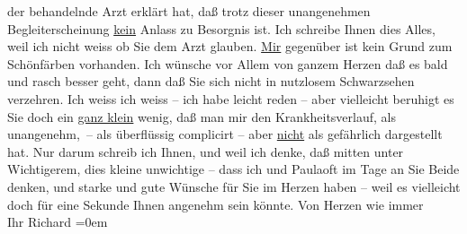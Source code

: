 \begin{ledgroupsized}[t]{13cm}
               der behandelnde Arzt erklärt
               hat, daß trotz dieser unangenehmen Begleiterscheinung \uline{kein} Anlass zu Besorgnis ist. Ich schreibe Ihnen dies Alles, weil ich {\pb}nicht weiss ob Sie dem Arzt glauben. \uline{Mir} gegenüber ist kein Grund zum Schönfärben
               vorhanden. Ich wünsche vor Allem von ganzem Herzen daß es bald und rasch {\pb}besser geht, dann daß Sie sich
               nicht in nutzlosem Schwarzsehen  verzehren. Ich
               weiss ich weiss – ich habe leicht reden – aber vielleicht beruhigt es Sie doch ein
                  \uline{ganz klein} wenig, daß man mir den
               Krankheitsverlauf, als unangenehm, – als überflüssig complicirt – aber \uline{nicht} als gefährlich dargestellt hat.\pend
           \pstart
           {\pb}Nur darum schreib ich Ihnen, und
               weil ich denke, daß mitten unter Wichtigerem, dies kleine unwichtige – dass ich und
                  Paulaoft im Tage an Sie Beide denken,
               und starke und gute Wünsche für Sie im Herzen haben – weil es vielleicht doch für
               eine Sekunde Ihnen angenehm sein könnte.\pend
           \pstart
           Von Herzen wie immer{\\[\baselineskip]}Ihr \spacefill\mbox{Richard}\pend
           \leftskip=0em{}
         
         \endnumbering{}\end{ledgroupsized}  \newcommand{\dateiname}{L01739}\newcommand{\titel}{Richard Beer-Hofmann an Arthur Schnitzler, [11. 12. 1907]}\newcommand{\editorInnen}{Martin Anton Müller und Gerd-Hermann Susen}
      